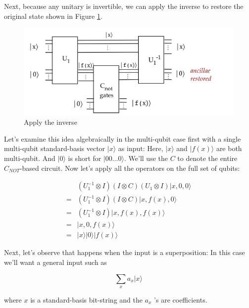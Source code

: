 \documentclass[main.tex]{subfiles}
\begin{document}
    Next, because any unitary is invertible, we can apply the inverse to restore the original state shown in Figure \ref{fig:41uncompute2}.
    
    \begin{figure}
        \centering
        \includegraphics[width=5in]{notes/figs/n10/41uncompute2.png}
        \caption{Apply the inverse}
        \label{fig:41uncompute2}
    \end{figure}
    
    Let's examine this idea algebraically in the multi-qubit case first with a single multi-qubit standard-basis vector $|x\rangle$ as input: Here, $|x\rangle$ and $|f(x)\rangle$ are both multi-qubit. And $|0\rangle$ is short for $|00 \ldots 0\rangle$. We'll use the $C$ to denote the entire $C_{N O T}$-based circuit. Now let's apply all the operators on the full set of qubits:
    
    $$
    \begin{aligned}
    &\left(U_{1}^{-1} \otimes I\right)(I \otimes C)\left(U_{1} \otimes I\right)|x, 0,0\rangle \\
    =&\left(U_{1}^{-1} \otimes I\right)(I \otimes C)|x, f(x), 0\rangle \\
    =&\left(U_{1}^{-1} \otimes I\right)|x, f(x), f(x)\rangle \\
    =&|x, 0, f(x)\rangle \\
    =&|x\rangle|0\rangle|f(x)\rangle
    \end{aligned}
    $$
    
    Next, let's observe that happens when the input is a superposition: In this case we'll want a general input such as
    
    $$\sum_{x} a_{x}|x\rangle$$
    
    where $x$ is a standard-basis bit-string and the $a_{x}$ 's are coefficients.
    
\end{document}
